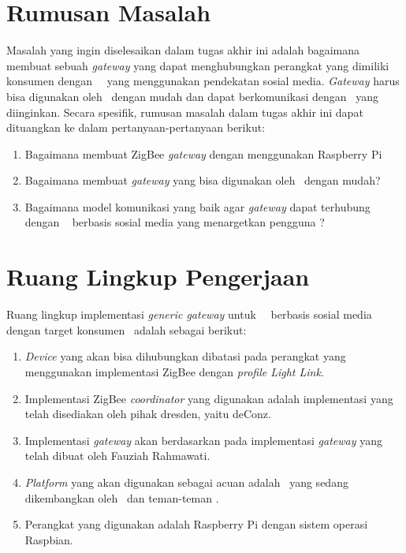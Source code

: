 \section{Rumusan Masalah}
Masalah yang ingin diselesaikan dalam tugas akhir ini adalah bagaimana membuat sebuah \textit{gateway} yang dapat menghubungkan perangkat yang dimiliki konsumen dengan \plat~\iot~yang menggunakan pendekatan sosial media. \textit{Gateway} harus bisa digunakan oleh \eu~dengan mudah dan dapat berkomunikasi dengan \plat~yang diinginkan. Secara spesifik, rumusan masalah dalam tugas akhir ini dapat dituangkan ke dalam pertanyaan-pertanyaan berikut:
\begin{enumerate}
	\item Bagaimana membuat ZigBee \textit{gateway} dengan menggunakan Raspberry Pi
	\item Bagaimana membuat \textit{gateway} yang bisa digunakan oleh \eu~dengan mudah?
	\item Bagaimana model komunikasi yang baik agar \textit{gateway} dapat terhubung dengan \plat~ berbasis sosial media yang menargetkan pengguna \eu?
\end{enumerate}


\section{Ruang Lingkup Pengerjaan}
Ruang lingkup implementasi \textit{generic gateway} untuk \plat~\iot~berbasis sosial media dengan target konsumen \eu~adalah sebagai berikut:
\begin{enumerate}
	\item \textit{Device} yang akan bisa dihubungkan dibatasi pada perangkat yang menggunakan implementasi ZigBee dengan \textit{profile Light Link}.
	\item Implementasi ZigBee \textit{coordinator} yang digunakan adalah implementasi yang telah disediakan oleh pihak dresden, yaitu deConz.
	\item Implementasi \textit{gateway} akan berdasarkan pada implementasi \textit{gateway} yang telah dibuat oleh Fauziah Rahmawati\cite{SkripsiFarah}.
	\item \textit{Platform} yang akan digunakan sebagai acuan adalah \plat~yang sedang dikembangkan oleh \saya~dan teman-teman \saya.
	\item Perangkat yang digunakan adalah Raspberry Pi  dengan sistem operasi Raspbian.
	
\end{enumerate}

